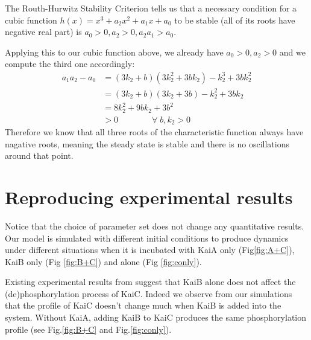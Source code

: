 \documentclass[a4paper,10pt]{article}
\numberwithin{equation}{section}
\begin{document}
The Routh-Hurwitz Stability Criterion tells us that a necessary condition for a cubic function $h(x)=x^3+a_2x^2+a_1x+a_0$ to be stable (all of its roots have negative real part) is $a_0>0, a_2>0, a_2a_1>a_0$.

Applying this to our cubic function above, we already have $a_0>0,a_2>0$ and we compute the third one accordingly:
\begin{equation}
\begin{split}
a_1a_2-a_0&=(3k_2+b)(3k_2^2+3bk_2)-k_2^3+3bk_2^2\\&
=(3k_2+b)(3k_2+3b)-k_2^2+3bk_2\\&
=8k_2^2+9bk_2+3b^2\\
&>0 \qquad \qquad \forall\; b,k_2>0
\end{split}
\end{equation}
Therefore we know that all three roots of the characteristic function always have nagative roots, meaning the steady state is stable and there is no oscillations around that point.



\section{Reproducing experimental results}

Notice that the choice of parameter set does not change any quantitative results. Our model is simulated with different initial conditions to produce dynamics under different situations when it is incubated with KaiA only (Fig\ref{fig:A+C}), KaiB only  (Fig \ref{fig:B+C}) and alone (Fig \ref{fig:conly}). 

Existing experimental results from \citet{kitayama2003} suggest that KaiB alone does not affect the (de)phosphorylation process of KaiC. Indeed we observe from our simulations that the profile of KaiC doesn't change much when KaiB is added into the system. Without KaiA, adding KaiB to KaiC produces the same phosphorylation profile (see Fig.\ref{fig:B+C} and Fig.\ref{fig:conly}).
\end{document}
